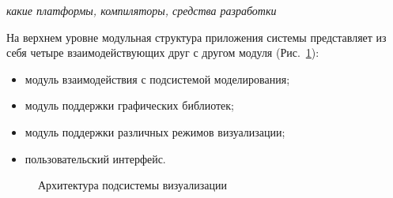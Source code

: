 \documentclass[a4paper,12pt]{extarticle}
\begin{document}
\textit{какие платформы, компиляторы, средства разработки}

На верхнем уровне модульная структура приложения системы представляет из себя четыре взаимодействующих друг с другом модуля (Рис.~\ref{ris:architecture-all}):
\begin{itemize}
    \item модуль взаимодействия с подсистемой моделирования;
    \item модуль поддержки графических библиотек;
    \item модуль поддержки различных режимов визуализации;
    \item пользовательский интерфейс.
\end{itemize}

\begin{figure}[h]
    \caption{Архитектура подсистемы визуализации}
    \label{ris:architecture-all}
\end{figure}
\end{document}
